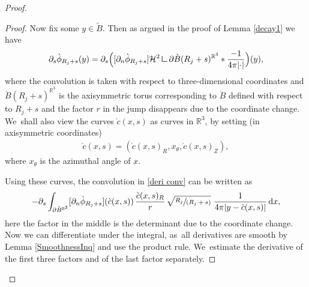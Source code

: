 \documentclass[JEP,XML,SOM,Unicode,published]{cedram}
\newcommand{\spfrac}[2]{\sfrac{#1}{(#2)}}
\theoremstyle{definition}
\newcommand\R{\mathbb{R}}
\newcommand\eq{=}
\newcommand\dd{\,\mathrm{d}}
\newcommand\dx{\dd x}
\newcommand{\mres}{\mathbin{\vrule height 1.6ex depth 0pt width
0.13ex\vrule height 0.13ex depth 0pt width 1.3ex}}
\let\de\partial
\begin{document}
\begin{proof}
\begin{proof}
Now fix some $y\in \tilde{B}$. Then as argued in the proof of Lemma \ref{decay1} we have
\begin{align}\label{deri conv}
\de_{s}\grave{\phi}_{R_j+s}(y)\eq \de_s\Bigl([\de_n\grave{\phi}_{R_j+s}]\mathcal{H}^2\mres\de\grave{B}(R_j+s)^{\R^3}*\frac{-1}{4\pi|{\cdot}|}\Bigr)(y),
\end{align}
where the convolution is taken with respect to three-dimensional coordinates and $\grave{B}(R_j+s)^{\R^3}$ is the axisymmetric torus corresponding to $\grave{B}$ defined with respect to $R_j+s$ and the factor $r$ in the jump disappears due to the coordinate change. We~shall also view the curves $\grave{c}(x,s)$ as curves in $\R^3$, by setting (in axisymmetric coordinates)
\begin{align*}
\grave{c}(x,s)\eq(\grave{c}(x,s)_R,x_\theta,\grave{c}(x,s)_Z),
\end{align*}
where $x_\theta$ is the azimuthal angle of $x$.

Using these curves, the convolution in \eqref{deri conv} can be written as
\begin{align*}
-\de_s\int_{\de\grave{B}^{\R^3}}[\de_n\grave{\phi}_{R_j+s}](\grave{c}(x,s))\,\frac{\grave{c}(x,s)_R}{r}\,\sqrt{\spfrac{R_j}{R_j+s}}\,\,\frac{1}{4\pi|y-\grave{c}(x,s)|}\dx,
\end{align*}
here the factor in the middle is the determinant due to the coordinate change. Now we can differentiate under the integral, as~all derivatives are smooth by Lemma \ref{SmoothnessInq} and use the product rule. We~estimate the derivative of the first three factors and of the last factor separately.


\end{proof}
\end{proof}
\end{document}
